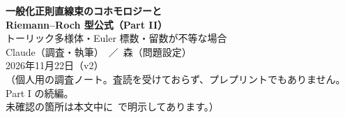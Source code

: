 

\sloppy
\begin{center}
{\LARGE\bfseries\sffamily 一般化正則直線束のコホモロジーと\\[3pt]Riemann--Roch 型公式（Part II）}\\[8pt]
{\large トーリック多様体・Euler 標数・留数が不等な場合}\\[12pt]
{\large Claude（調査・執筆）\ ／\ 森（問題設定）}\\[3pt]
2026年11月22日（v2）\\[3pt]
{\small （個人用の調査ノート。査読を受けておらず、プレプリントでもありません。Part I の続編。\\
未確認の箇所は本文中に\tQ\ で明示してあります。）}
\end{center}
\begin{abstract}\noindent
Part I で得た曲面・トーリックの結果を拡張する。(1) 任意の次元・任意の正則 Poisson 構造で、全複体の Euler 標数が $(-1)^n\rk(E)\chi(X)$ であること（定理 E）。(2) トーリック多様体上の対数 de Rham 複体のコホモロジーを留数から決まる単体複体の被約コホモロジーで書き（定理 C1）、トーリック曲面で留数が不等な場合の Poincaré 多項式の閉公式を得た（定理 C2）。(3) トーリック多様体（任意の偶数次元）の一般的な対数シンプレクティック構造で $\HH^*=H^*(U;L_U)\oplus\C^{\chi(X)}[-n]$（定理 T、仮定の役割の表つき）。(4) 共鳴 $r_i=1$、準斉次な平面曲線の特異点、留数が不等な三重点についての計算に基づく公式（予想を含む）。(5) Part I の記述への影響の確認：撤回すべき主張はなかった。Kodaira 埋め込みの一般化と指数定理は得られていない。
\end{abstract}


